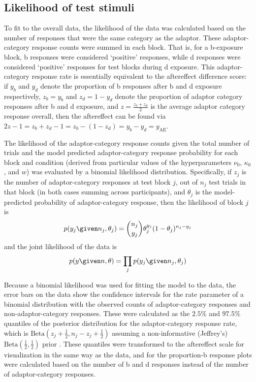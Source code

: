 \subsection{Likelihood of test stimuli}
\label{sec:likel-test-stim}

To fit to the overall data, the likelihood of the data was calculated based on the number of responses that were the same category as the adaptor.  These adaptor-category response counts were summed in each block.  That is, for a \ph b-exposure block, \ph b responses were considered `positive' responses, while \ph d responses were considered `positive' responses for test blocks during \ph d exposure.  This adaptor-category response rate is essentially equivalent to the aftereffect difference score: if $y_b$ and $y_d$ denote the proportion of \ph b responses after \ph b and \ph d exposure respectively, $z_b=y_b$ and $z_d = 1-y_d$ denote the proportion of adaptor category responses after \ph b and \ph d exposure, and $z = \frac{z_b+z_d}{2}$ is the average adaptor category response overall, then the aftereffect can be found via $2z - 1 = z_b+z_d - 1= z_b - (1-z_d)  = y_b - y_d = y_\mathrm{AE}$.

The likelihood of the adaptor-category response counts given the total number of trials and the model predicted adaptor-category response probability for each block and condition (derived from particular values of the hyperparameters $\nu_0$, $\kappa_0$, and $w$) was evaluated by a binomial likelihood distribution.  Specifically, if $z_j$ is the number of adaptor-category responses at test block $j$, out of $n_j$ test trials in that block (in both cases summing across participants), and $\theta_j$ is the model-predicted probability of adaptor-category response, then the likelihood of block $j$ is
\begin{equation}
  p(y_j \given n_j, \theta_j) = \binom{n_j}{y_j} \theta_j ^ {y_j} (1-\theta_j)^{n_j - y_j}
\end{equation}
and the joint likelihood of the data is
\begin{equation}
  p(y \given n, \theta) = \prod_j p(y_j \given n_j,\theta_j)
\end{equation}

Because a binomial likelihood was used for fitting the model to the data, the error bars on the data show the confidence intervals for the rate parameter of a binomial distribution with the observed counts of adaptor-category responses and non-adaptor-category responses.  These were calculated as the $2.5\%$ and $97.5\%$ quantiles of the posterior distribution for the adaptor-category response rate, which is $\mathrm{Beta} (z_j+\frac{1}{2}, n_j-z_j+\frac{1}{2})$ assuming a non-informative (Jeffrey's) $\mathrm{Beta}(\frac{1}{2}, \frac{1}{2})$ prior \autocite{Gelman2003}.  These quantiles were transformed to the aftereffect scale for visualization in the same way as the data, and for the proportion-\ph b response plots were calculated based on the number of \ph b and \ph d responses instead of the number of adaptor-category responses.

